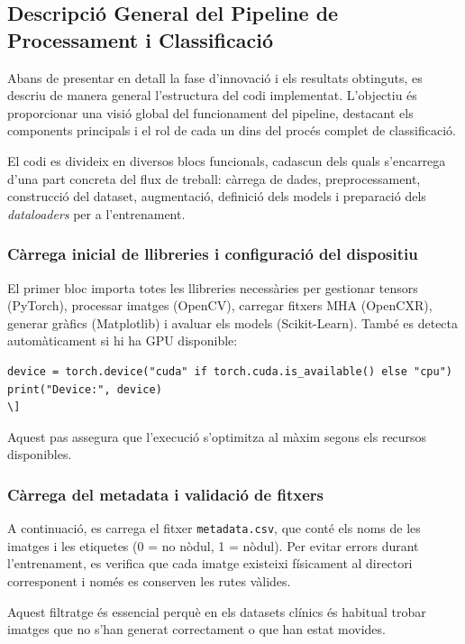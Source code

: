 \documentclass[12pt,a4paper]{article}
\begin{document}
\subsection{Descripció General del Pipeline de Processament i Classificació}

Abans de presentar en detall la fase d’innovació i els resultats obtinguts, es descriu de
manera general l’estructura del codi implementat. L’objectiu és proporcionar una visió
global del funcionament del pipeline, destacant els components principals i el rol de
cada un dins del procés complet de classificació.

El codi es divideix en diversos blocs funcionals, cadascun dels quals s’encarrega d’una
part concreta del flux de treball: càrrega de dades, preprocessament, construcció del
dataset, augmentació, definició dels models i preparació dels \textit{dataloaders} per a
l’entrenament.

\subsubsection{Càrrega inicial de llibreries i configuració del dispositiu}

El primer bloc importa totes les llibreries necessàries per gestionar tensors
(PyTorch), processar imatges (OpenCV), carregar fitxers MHA (OpenCXR), generar gràfics
(Matplotlib) i avaluar els models (Scikit-Learn). També es detecta automàticament si hi
ha GPU disponible:

\begin{lstlisting}[style=mypython]
device = torch.device("cuda" if torch.cuda.is_available() else "cpu")
print("Device:", device)
\]
\end{lstlisting}
Aquest pas assegura que l’execució s’optimitza al màxim segons els recursos disponibles.

\subsubsection{Càrrega del metadata i validació de fitxers}

A continuació, es carrega el fitxer \texttt{metadata.csv}, que conté els noms de les
imatges i les etiquetes (0 = no nòdul, 1 = nòdul). Per evitar errors durant
l’entrenament, es verifica que cada imatge existeixi físicament al directori corresponent
i només es conserven les rutes vàlides.

Aquest filtratge és essencial perquè en els datasets clínics és habitual trobar imatges
que no s’han generat correctament o que han estat movides.
\end{document}
